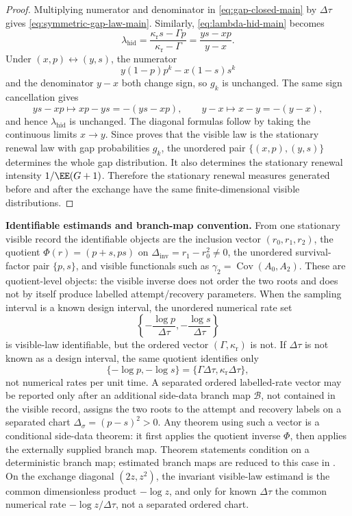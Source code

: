 \begin{proof}
Multiplying numerator and denominator in \eqref{eq:gap-closed-main} by
\(\Delta\tau\) gives \eqref{eq:symmetric-gap-law-main}.  Similarly,
\eqref{eq:lambda-hid-main} becomes
\[
\lambda_{\mathrm{hid}}
=\frac{\kappa_{\mathrm r}s-\Gamma p}{\kappa_{\mathrm r}-\Gamma}
=\frac{y s-x p}{y-x}.
\]
Under \((x,p)\leftrightarrow(y,s)\), the numerator
\[
y(1-p)p^k-x(1-s)s^k
\]
and the denominator \(y-x\) both change sign, so \(g_k\) is unchanged.  The
same sign cancellation gives
\[
y s-x p\longmapsto x p-y s=-(y s-x p),
\qquad
y-x\longmapsto x-y=-(y-x),
\]
and hence \(\lambda_{\mathrm{hid}}\) is unchanged.  The diagonal formulas
follow by taking the continuous limits \(x\to y\).  Since
 proves that the visible law is the stationary
renewal law with gap probabilities \(g_k\), the unordered pair
\(\{(x,p),(y,s)\}\) determines the whole gap distribution.  It also determines
the stationary renewal intensity \(1/\EE(G+1)\).  Therefore the stationary
renewal measures generated before and after the exchange have the same
finite-dimensional visible distributions.
\end{proof}

\begin{convention}\label{conv:branch-map-labelled-rates-main}
\textbf{Identifiable estimands and branch-map convention.}
From one stationary visible record the identifiable objects are the inclusion
vector \((r_0,r_1,r_2)\), the quotient
\(\Phi(r)=(p+s,ps)\) on
\(\Delta_{\mathrm{inv}}=r_1-r_0^2\ne0\), the unordered survival-factor pair
\(\{p,s\}\), and visible functionals such as
\(\gamma_2=\operatorname{Cov}(A_0,A_2)\).  These are quotient-level objects:
the visible inverse does not order the two roots and does not by itself
produce labelled attempt/recovery parameters.  When the sampling interval is
a known design interval, the unordered numerical rate set
\[
\left\{-\frac{\log p}{\Delta\tau},
       -\frac{\log s}{\Delta\tau}\right\}
\]
is visible-law identifiable, but the ordered vector
\((\Gamma,\kappa_{\mathrm r})\) is not.  If \(\Delta\tau\) is not known as a
design interval, the same quotient identifies only
\[
\{-\log p,-\log s\}
=\{\Gamma\Delta\tau,\kappa_{\mathrm r}\Delta\tau\},
\]
not numerical rates per unit time.  A separated ordered labelled-rate vector
may be reported only after an additional side-data branch map
\(\mathcal B\), not contained in the visible record, assigns the two roots to
the attempt and recovery labels on a separated chart
\(\Delta_\sigma=(p-s)^2>0\).  Any theorem using such a vector is a
conditional side-data theorem: it first applies the quotient inverse
\(\Phi\), then applies the externally supplied branch map.  Theorem statements
condition on a deterministic branch map; estimated branch maps are reduced to
this case in .  On the exchange
diagonal \((2z,z^2)\), the invariant visible-law estimand is the common
dimensionless product \(-\log z\), and only for known \(\Delta\tau\) the common
numerical rate \(-\log z/\Delta\tau\), not a separated ordered chart.
\end{convention}

